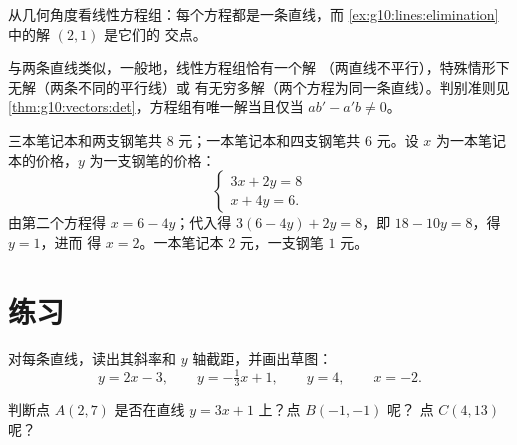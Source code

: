 \begin{omfigure}

{\small 从几何角度看线性方程组：每个方程都是一条直线，而
\cref{ex:g10:lines:elimination}中的解 $(2,1)$ 是它们的
交点。}
\end{omfigure}

\begin{remark}[有几个解？]
与两条直线类似，一般地，线性方程组恰有一个解
（两直线不平行），特殊情形下无解（两条不同的平行线）或
有无穷多解（两个方程为同一条直线）。判别准则见
\cref{thm:g10:vectors:det}，方程组有唯一解当且仅当
$ab' - a'b \neq 0$。
\end{remark}

\begin{example}[列方程组建模]\label{ex:g10:lines:modeling}
三本笔记本和两支钢笔共 $8$ 元；一本笔记本和四支钢笔共
$6$ 元。设 $x$ 为一本笔记本的价格，$y$ 为一支钢笔的价格：
\[
\begin{cases}
3x + 2y = 8 \\
x + 4y = 6 .
\end{cases}
\]
由第二个方程得 $x = 6 - 4y$；代入得
$3(6 - 4y) + 2y = 8$，即 $18 - 10y = 8$，得 $y = 1$，进而
得 $x = 2$。一本笔记本 $2$ 元，一支钢笔 $1$ 元。
\end{example}

\section{练习}

\begin{exercise}[$\star$]\label{exo:g10:lines:1}
对每条直线，读出其斜率和 $y$ 轴截距，并画出草图：
\[
y = 2x - 3, \qquad
y = -\tfrac13 x + 1, \qquad
y = 4, \qquad
x = -2 .
\]
\end{exercise}

\begin{exercise}[$\star$]\label{exo:g10:lines:2}
判断点 $A(2, 7)$ 是否在直线 $y = 3x + 1$ 上？点 $B(-1, -1)$ 呢？
点 $C(4, 13)$ 呢？
\end{exercise}

